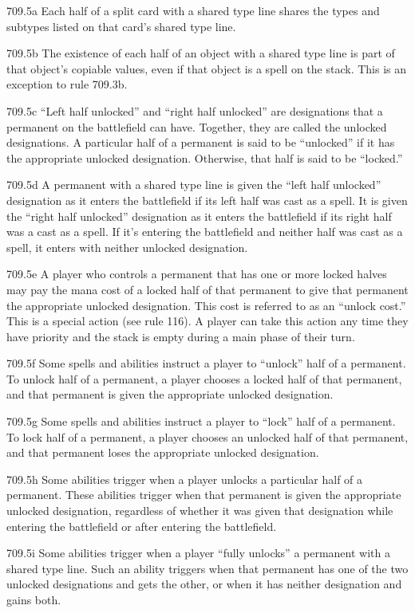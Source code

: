 709.5a Each half of a split card with a shared type line shares the types and subtypes listed on that card’s shared type line.

709.5b The existence of each half of an object with a shared type line is part of that object’s copiable values, even if that object is a spell on the stack. This is an exception to rule 709.3b.

709.5c “Left half unlocked” and “right half unlocked” are designations that a permanent on the battlefield can have. Together, they are called the unlocked designations. A particular half of a permanent is said to be “unlocked” if it has the appropriate unlocked designation. Otherwise, that half is said to be “locked.”

709.5d A permanent with a shared type line is given the “left half unlocked” designation as it enters the battlefield if its left half was cast as a spell. It is given the “right half unlocked” designation as it enters the battlefield if its right half was a cast as a spell. If it’s entering the battlefield and neither half was cast as a spell, it enters with neither unlocked designation.

709.5e A player who controls a permanent that has one or more locked halves may pay the mana cost of a locked half of that permanent to give that permanent the appropriate unlocked designation. This cost is referred to as an “unlock cost.” This is a special action (see rule 116). A player can take this action any time they have priority and the stack is empty during a main phase of their turn.

709.5f Some spells and abilities instruct a player to “unlock” half of a permanent. To unlock half of a permanent, a player chooses a locked half of that permanent, and that permanent is given the appropriate unlocked designation.

709.5g Some spells and abilities instruct a player to “lock” half of a permanent. To lock half of a permanent, a player chooses an unlocked half of that permanent, and that permanent loses the appropriate unlocked designation.

709.5h Some abilities trigger when a player unlocks a particular half of a permanent. These abilities trigger when that permanent is given the appropriate unlocked designation, regardless of whether it was given that designation while entering the battlefield or after entering the battlefield.

709.5i Some abilities trigger when a player “fully unlocks” a permanent with a shared type line. Such an ability triggers when that permanent has one of the two unlocked designations and gets the other, or when it has neither designation and gains both.

